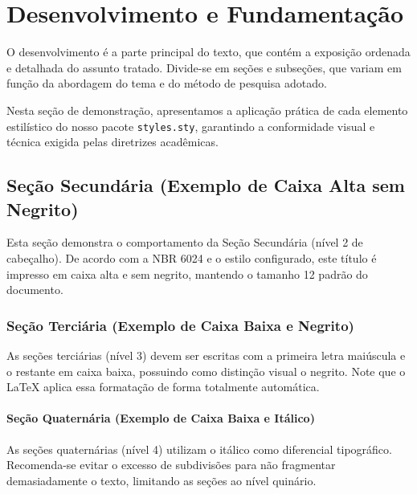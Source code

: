 
\chapter{Desenvolvimento e Fundamentação}

O desenvolvimento é a parte principal do texto, que contém a exposição ordenada e detalhada do assunto tratado. Divide-se em seções e subseções, que variam em função da abordagem do tema e do método de pesquisa adotado.

Nesta seção de demonstração, apresentamos a aplicação prática de cada elemento estilístico do nosso pacote \texttt{styles.sty}, garantindo a conformidade visual e técnica exigida pelas diretrizes acadêmicas.

\section{Seção Secundária (Exemplo de Caixa Alta sem Negrito)}

Esta seção demonstra o comportamento da Seção Secundária (nível 2 de cabeçalho). De acordo com a NBR 6024 e o estilo configurado, este título é impresso em caixa alta e sem negrito, mantendo o tamanho 12 padrão do documento.

\subsection{Seção Terciária (Exemplo de Caixa Baixa e Negrito)}

As seções terciárias (nível 3) devem ser escritas com a primeira letra maiúscula e o restante em caixa baixa, possuindo como distinção visual o negrito. Note que o LaTeX aplica essa formatação de forma totalmente automática.

\subsubsection{Seção Quaternária (Exemplo de Caixa Baixa e Itálico)}

As seções quaternárias (nível 4) utilizam o itálico como diferencial tipográfico. Recomenda-se evitar o excesso de subdivisões para não fragmentar demasiadamente o texto, limitando as seções ao nível quinário.

